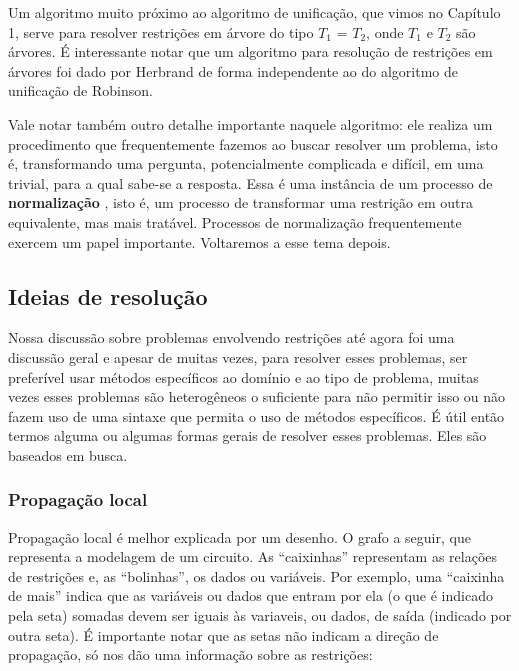 \documentclass{article}
\theoremstyle{remark}
\theoremstyle{theorem}
\begin{document}
Um algoritmo muito próximo ao algoritmo de unificação, que vimos no Capítulo 1, serve para resolver restrições em árvore do tipo $T_1$ = $T_2$, onde $T_1$ e $T_2$ são árvores. É interessante notar que um algoritmo para resolução de restrições em árvores foi dado por Herbrand\cite{herbrand} de forma independente ao do algoritmo de unificação de Robinson.

Vale notar também outro detalhe importante naquele algoritmo: ele realiza um procedimento que frequentemente fazemos ao buscar resolver um problema, isto é, transformando uma pergunta, potencialmente complicada e difícil, em uma trivial, para a qual sabe-se a resposta. Essa é uma instância de um processo de \textbf{normalização} , isto é, um processo de transformar uma restrição em outra equivalente, mas mais tratável. Processos de normalização frequentemente
exercem um papel importante. Voltaremos a esse tema depois.

\subsection{Ideias de resolução}

Nossa discussão sobre problemas envolvendo restrições até agora foi uma discussão geral e apesar de muitas vezes, para resolver esses problemas, ser preferível usar métodos específicos ao domínio e ao tipo de problema, muitas vezes esses problemas são heterogêneos o suficiente para não permitir isso ou não fazem uso de uma sintaxe que permita o uso de métodos específicos.
É útil então termos alguma ou algumas formas gerais de resolver esses problemas. Eles são baseados em busca.

\subsubsection{Propagação local}

Propagação local é melhor explicada por um desenho. O grafo a seguir, que representa a modelagem de um circuito. As ``caixinhas'' representam as relações de restrições e, as ``bolinhas'', os dados ou variáveis. Por exemplo, uma ``caixinha de mais'' indica que as variáveis ou dados que entram por ela (o que é indicado pela seta) somadas devem ser iguais às variaveis, ou dados, de saída (indicado por outra seta).
É importante notar que as setas não indicam a direção de propagação, só nos dão uma informação sobre as restrições:
\end{document}
